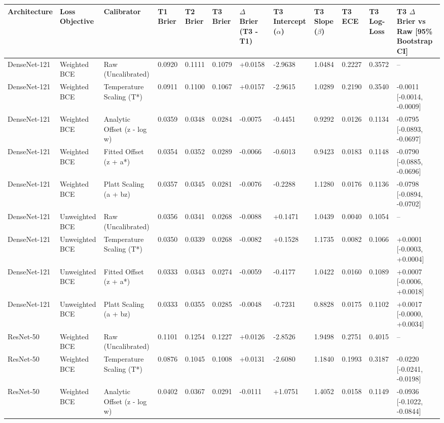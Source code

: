 \begin{tabular}{llllllllllll}
\toprule
Architecture & Loss Objective & Calibrator & T1 Brier & T2 Brier & T3 Brier & $\Delta$ Brier (T3 - T1) & T3 Intercept ($\alpha$) & T3 Slope ($\beta$) & T3 ECE & T3 Log-Loss & T3 $\Delta$ Brier vs Raw [95\% Bootstrap CI] \\
\midrule
DenseNet-121 & Weighted BCE & Raw (Uncalibrated) & 0.0920 & 0.1111 & 0.1079 & +0.0158 & -2.9638 & 1.0484 & 0.2227 & 0.3572 & -- \\
DenseNet-121 & Weighted BCE & Temperature Scaling (T*) & 0.0911 & 0.1100 & 0.1067 & +0.0157 & -2.9615 & 1.0289 & 0.2190 & 0.3540 & -0.0011 [-0.0014, -0.0009] \\
DenseNet-121 & Weighted BCE & Analytic Offset (z - log w) & 0.0359 & 0.0348 & 0.0284 & -0.0075 & -0.4451 & 0.9292 & 0.0126 & 0.1134 & -0.0795 [-0.0893, -0.0697] \\
DenseNet-121 & Weighted BCE & Fitted Offset (z + a*) & 0.0354 & 0.0352 & 0.0289 & -0.0066 & -0.6013 & 0.9423 & 0.0183 & 0.1148 & -0.0790 [-0.0885, -0.0696] \\
DenseNet-121 & Weighted BCE & Platt Scaling (a + bz) & 0.0357 & 0.0345 & 0.0281 & -0.0076 & -0.2288 & 1.1280 & 0.0176 & 0.1136 & -0.0798 [-0.0894, -0.0702] \\
DenseNet-121 & Unweighted BCE & Raw (Uncalibrated) & 0.0356 & 0.0341 & 0.0268 & -0.0088 & +0.1471 & 1.0439 & 0.0040 & 0.1054 & -- \\
DenseNet-121 & Unweighted BCE & Temperature Scaling (T*) & 0.0350 & 0.0339 & 0.0268 & -0.0082 & +0.1528 & 1.1735 & 0.0082 & 0.1066 & +0.0001 [-0.0003, +0.0004] \\
DenseNet-121 & Unweighted BCE & Fitted Offset (z + a*) & 0.0333 & 0.0343 & 0.0274 & -0.0059 & -0.4177 & 1.0422 & 0.0160 & 0.1089 & +0.0007 [-0.0006, +0.0018] \\
DenseNet-121 & Unweighted BCE & Platt Scaling (a + bz) & 0.0333 & 0.0355 & 0.0285 & -0.0048 & -0.7231 & 0.8828 & 0.0175 & 0.1102 & +0.0017 [-0.0000, +0.0034] \\
ResNet-50 & Weighted BCE & Raw (Uncalibrated) & 0.1101 & 0.1254 & 0.1227 & +0.0126 & -2.8526 & 1.9498 & 0.2751 & 0.4015 & -- \\
ResNet-50 & Weighted BCE & Temperature Scaling (T*) & 0.0876 & 0.1045 & 0.1008 & +0.0131 & -2.6080 & 1.1840 & 0.1993 & 0.3187 & -0.0220 [-0.0241, -0.0198] \\
ResNet-50 & Weighted BCE & Analytic Offset (z - log w) & 0.0402 & 0.0367 & 0.0291 & -0.0111 & +1.0751 & 1.4052 & 0.0158 & 0.1149 & -0.0936 [-0.1022, -0.0844] \\

\end{tabular}
